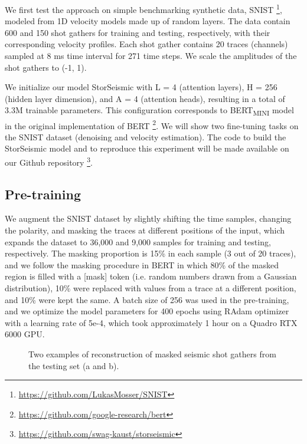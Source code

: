 \documentclass{article}
\begin{document}
We first test the approach on simple benchmarking synthetic data, SNIST \footnote{\url{https://github.com/LukasMosser/SNIST}}, modeled from 1D velocity models made up of random layers. The data contain 600 and 150 shot gathers for training and testing, respectively, with their corresponding velocity profiles. Each shot gather contains 20 traces (channels) sampled at 8 ms time interval for 271 time steps. We scale the amplitudes of the shot gathers to (-1, 1).

We initialize our model StorSeismic with L = 4 (attention layers), H = 256 (hidden layer dimension), and A = 4 (attention heads), resulting in a total of 3.3M trainable parameters. This configuration corresponds to BERT\textsubscript{MINI} model in the original implementation of BERT \footnote{\url{https://github.com/google-research/bert}}. We will show two fine-tuning tasks on the SNIST dataset (denoising and velocity estimation). The code to build the StorSeismic model and to reproduce this experiment will be made available on our Github repository \footnote{\url{https://github.com/swag-kaust/storseismic}}.

\subsection{Pre-training}
We augment the SNIST dataset by slightly shifting the time samples, changing the polarity, and masking the traces at different positions of the input, which expands the dataset to 36,000 and 9,000 samples for training and testing, respectively. The masking proportion is 15\% in each sample (3 out of 20 traces), and we follow the masking procedure in BERT \cite{devlin2018bert} in which 80\% of the masked region is filled with a [mask] token (i.e. random numbers drawn from a Gaussian distribution), 10\% were replaced with values from a trace at a different position, and 10\% were kept the same. A batch size of 256 was used in the pre-training, and we optimize the model parameters for 400 epochs using RAdam optimizer \cite{liu2019variance} with a learning rate of 5e-4, which took approximately 1 hour on a Quadro RTX 6000 GPU. 

\begin{figure}[!h]
    \hspace{1.3cm}
    \newline
    \centering
    \caption{Two examples of reconstruction of masked seismic shot gathers from the testing set (a and b).}
    \label{fig:fig2}
\end{figure}
\end{document}
